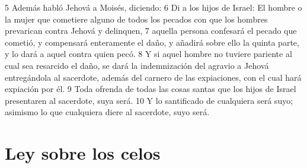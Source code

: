 5 Además habló Jehová a Moisés, diciendo:
6 Di a los hijos de Israel: El hombre o la mujer que cometiere alguno de todos los pecados con que los hombres prevarican contra Jehová y delinquen,
7 aquella persona confesará el pecado que cometió, y compensará enteramente el daño, y añadirá sobre ello la quinta parte, y lo dará a aquel contra quien pecó.
8 Y si aquel hombre no tuviere pariente al cual sea resarcido el daño, se dará la indemnización del agravio a Jehová entregándola al sacerdote, además del carnero de las expiaciones, con el cual hará expiación por él. 
9 Toda ofrenda de todas las cosas santas que los hijos de Israel presentaren al sacerdote, suya será.
10 Y lo santificado de cualquiera será suyo; asimismo lo que cualquiera diere al sacerdote, suyo será.

\section*{Ley sobre los celos}

